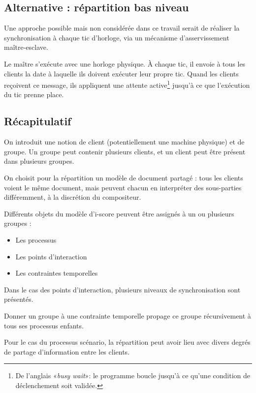 \documentclass[10pt]{article}
\begin{document}
\subsection{Alternative : répartition bas niveau}
Une approche possible mais non considérée dans ce travail serait de réaliser la synchronisation à chaque tic d'horloge, via un mécanisme d'asservissement maître-esclave.

Le maître s'exécute avec une horloge physique.
À chaque tic, il envoie à tous les clients la date à laquelle ils doivent exécuter leur propre tic. 
Quand les clients reçoivent ce message, ils appliquent une attente active\footnote{De l'anglais «\textit{busy wait}»: le programme boucle jusqu'à ce qu'une condition de déclenchement soit validée.} jusqu'à ce que l'exécution du tic prenne place.
\subsection{Récapitulatif}
On introduit une notion de client (potentiellement une machine physique) et de groupe.
Un groupe peut contenir plusieurs clients, et un client peut être présent dans plusieurs groupes.

On choisit pour la répartition un modèle de document partagé : tous les clients voient le même document, mais peuvent chacun en interpréter des sous-parties différemment, à la discrétion du compositeur.

Différents objets du modèle d'i-score peuvent être assignés à un ou plusieurs groupes : 

\begin{itemize}
	\item Les processus
	\item Les points d'interaction
	\item Les contraintes temporelles
\end{itemize}

Dans le cas des points d'interaction, plusieurs niveaux de synchronisation sont présentés.

Donner un groupe à une contrainte temporelle propage ce groupe récursivement à tous ses processus enfants.

Pour le cas du processus scénario, la répartition peut avoir lieu avec divers degrés de partage d'information entre les clients.
\end{document}
